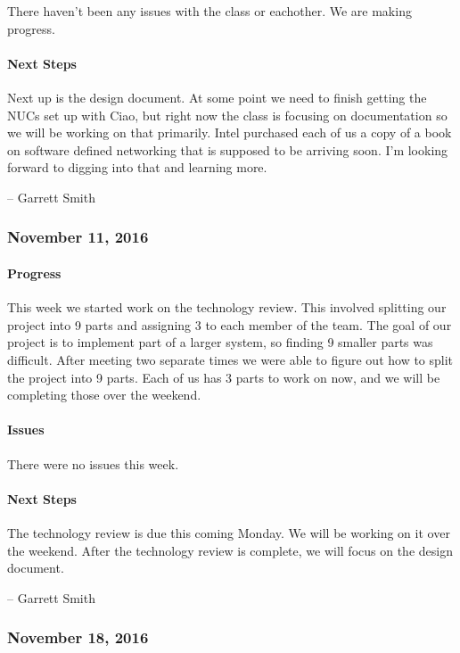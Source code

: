 \documentclass[10pt,onecolumn,journal,draftclsnofoot]{IEEEtran}
\begin{document}
There haven't been any issues with the class or eachother. We are making
progress.

\paragraph{Next Steps} 

Next up is the design document. At some point we need to finish getting
the NUCs set up with Ciao, but right now the class is focusing on
documentation so we will be working on that primarily. Intel purchased
each of us a copy of a book on software defined networking that is
supposed to be arriving soon. I'm looking forward to digging into that
and learning more.

-- Garrett Smith

\subsubsection{November 11, 2016} 

\paragraph{Progress} 

This week we started work on the technology review. This involved
splitting our project into 9 parts and assigning 3 to each member of the
team. The goal of our project is to implement part of a larger system,
so finding 9 smaller parts was difficult. After meeting two separate
times we were able to figure out how to split the project into 9 parts.
Each of us has 3 parts to work on now, and we will be completing those
over the weekend.

\paragraph{Issues} 

There were no issues this week.

\paragraph{Next Steps} 

The technology review is due this coming Monday. We will be working on
it over the weekend. After the technology review is complete, we will
focus on the design document.

-- Garrett Smith

\subsubsection{November 18, 2016} 
\end{document}
